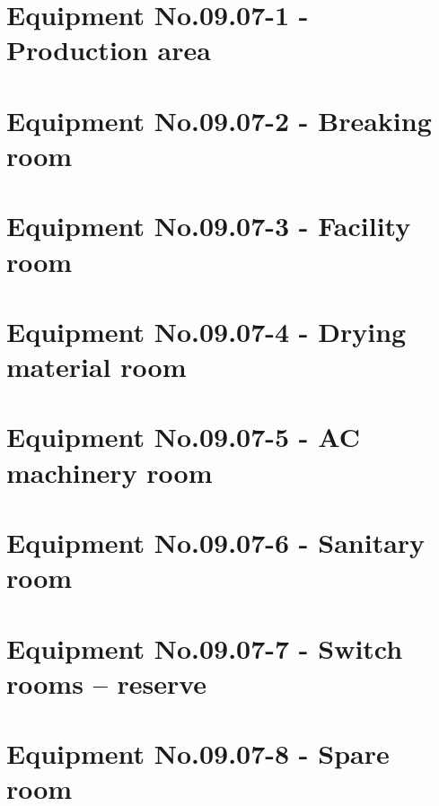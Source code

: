 \clearpage
\section{Equipment No.09.07-1 - Production area}

\clearpage
\section{Equipment No.09.07-2	- Breaking room}

\clearpage
\section{Equipment No.09.07-3	- Facility room}

\clearpage
\section{Equipment No.09.07-4	- Drying material room}

\clearpage
\section{Equipment No.09.07-5	- AC machinery room}

\clearpage
\section{Equipment No.09.07-6	- Sanitary room}

\clearpage
\section{Equipment No.09.07-7	- Switch rooms – reserve}

\clearpage
\section{Equipment No.09.07-8	- Spare room}

\twoColls{

}{

}
